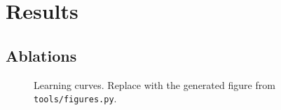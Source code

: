 \section{Results}
\label{sec:results}


\subsection{Ablations}

\begin{figure}[t]
  \centering
  \caption{Learning curves. Replace with the generated figure from
    \texttt{tools/figures.py}.}
  \label{fig:learning_curves}
\end{figure}
